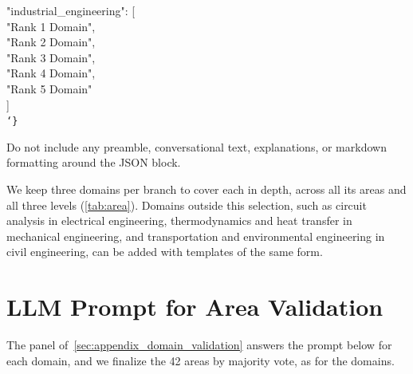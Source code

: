 \begin{tcolorbox}[
    colback=gray!5,
    colframe=gray!40,
    boxrule=0.4pt,
    arc=2pt,
    left=6pt,
    right=6pt,
    top=6pt,
    bottom=6pt,
    breakable
]
\vspace{2pt}
\hspace*{1em}"industrial\_engineering": [\\
\hspace*{2em}"Rank 1 Domain",\\
\hspace*{2em}"Rank 2 Domain",\\
\hspace*{2em}"Rank 3 Domain",\\
\hspace*{2em}"Rank 4 Domain",\\
\hspace*{2em}"Rank 5 Domain"\\
\hspace*{1em}]\\

\vspace{2pt}
\texttt{\char`\}}
\egroup
\vspace{8pt}

Do not include any preamble, conversational text, explanations, or markdown formatting around the JSON block.
\end{tcolorbox}

We keep three domains per branch to cover each in depth, across all its areas and all three levels
(\autoref{tab:area}).
Domains outside this selection, such as circuit analysis in electrical engineering, thermodynamics
and heat transfer in mechanical engineering, and transportation and environmental engineering in
civil engineering, can be added with templates of the same form.

\section{LLM Prompt for Area Validation}
\label{sec:appendix_area_validation}

The panel of~\autoref{sec:appendix_domain_validation} answers the prompt below for each domain, and
we finalize the 42 areas by majority vote, as for the domains.

